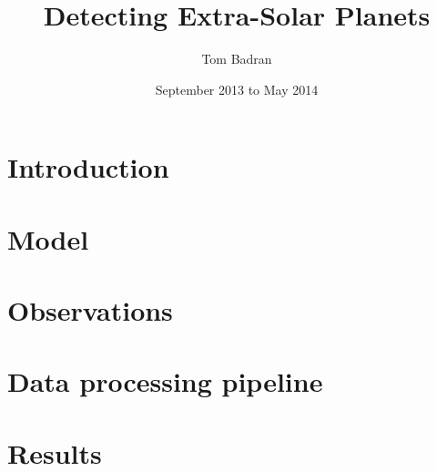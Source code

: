 \documentclass[a4paper]{article}
\title{Detecting Extra-Solar Planets}
\author{Tom Badran}
\date{September 2013 to May 2014}
\numberwithin{equation}{section}
\begin{document}
\maketitle

\tableofcontents
\listoffigures
\listoftables

\begin{abstract}

\end{abstract}

\section{Introduction}


\section{Model}


\section{Observations}


\section{Data processing pipeline}


\section{Results}




\break
\appendix
{}


\end{document}

